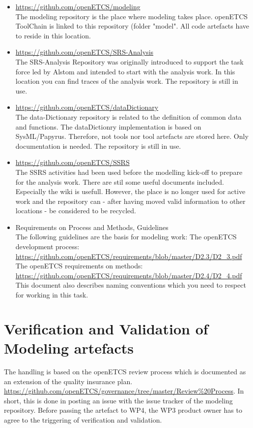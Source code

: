 \documentclass{template/openetcs_article}
\begin{document}
\begin{itemize}
\item \url{https://github.com/openETCS/modeling}\\
The modeling repository is the place where modeling takes place. openETCS ToolChain is linked to this repository (folder "model". All code artefacts have to reside in this location. 


\item \url{https://github.com/openETCS/SRS-Analysis}\\
The SRS-Analysis Repository was originally introduced to support the task force led by Alstom and intended to start with the analysis work.
In this location you can find traces of the analysis work. The repository is still in use.

\item \url{https://github.com/openETCS/dataDictionary}\\
The data-Dictionary repository is related to the definition of common data and functions. The dataDictionry implementation is based on SysML/Papyrus. Therefore, not tools nor tool artefacts are stored here. Only documentation is needed. The repository is still in use.

\item \url{https://github.com/openETCS/SSRS}\\
The SSRS activities had been used before the modelling kick-off to prepare for the analysis work. There are stil some useful documents included. Especially the wiki is usefull.
However, the place is no longer used for active work and the repository can - after having moved valid information to other locations - be considered to be recycled.

\item Requirements on Process and Methods, Guidelines\\
The following guidelines are the basis for modeling work:
The openETCS development process: \url{https://github.com/openETCS/requirements/blob/master/D2.3/D2_3.pdf}\\
The openETCS requirements on methods: \url{https://github.com/openETCS/requirements/blob/master/D2.4/D2_4.pdf} 
This document also describes naming conventions which you need to respect for working in this task.

\end{itemize}




\section{Verification and Validation of Modeling artefacts}
The handling is based on the openETCS review process which is documented as an extension of the quality insurance plan. \url{https://github.com/openETCS/governance/tree/master/Review%20Process}.
In short, this is done in posting an issue with the issue tracker of the modeling repository. 
Before passing the artefact to WP4, the WP3 product owner has to agree to the triggering of verification and validation.



\nocite{*}
\end{document}
